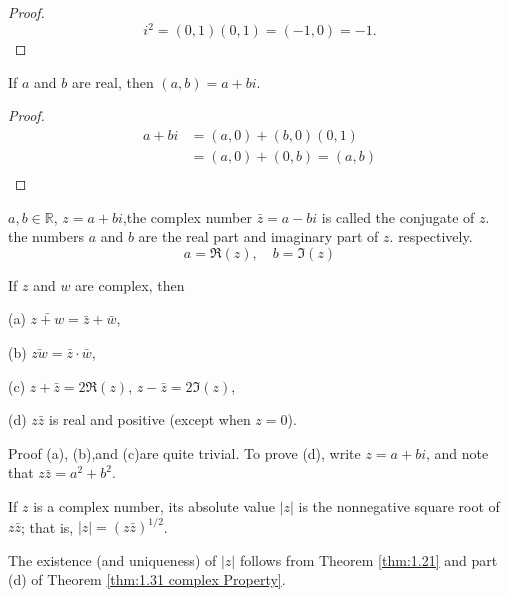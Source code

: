 \begin{proof}
    \begin{equation*}
        i^2=(0,1)(0,1)=(-1,0)=-1.
    \end{equation*}
\end{proof}

\begin{thm}\label{thm:1.29 complex number Transfer}
    If $a$ and $b$ are real, then $(a,b) =a + bi$.
\end{thm}

\begin{proof}
    \begin{align*}
        a+bi
        &=(a,0)+(b,0)(0,1)\\
        &=(a,0)+(0,b)=(a,b)\\
    \end{align*}
\end{proof}

\begin{myDef}\label{myDef:1.30 conjugate}
    $a,b\in \mathbb{R}$, $z=a+bi$,the complex number $\bar{z}=a-bi$ is called the conjugate of $z$. the numbers $a$ and $b$ are the real part and imaginary part of $z$. respectively.
    \begin{equation*}
        a=\Re(z), \quad
        b=\Im(z)
    \end{equation*}
\end{myDef}

\begin{thm}\label{thm:1.31 complex Property}
    If $z$ and $w$ are complex, then

    (a) $\bar{z+w}=\bar{z}+\bar{w}$,

    (b) $\bar{zw}=\bar{z}\cdot\bar{w}$,

    (c) $z+\bar{z}=2\Re(z)$, $z-\bar{z}=2\Im(z)$,

    (d) $z\bar{z}$ is real and positive (except when $z=0$).
\end{thm}
Proof (a), (b),and (c)are quite trivial. To prove (d), write $z = a + bi$,
and note that $z\bar{z} = a^2 + b^2$.

\begin{myDef}\label{myDef:1.32 complex_absolutevalue}
    If $z$ is a complex number, its absolute value $|z|$ is the nonnegative square root of $z\bar{z}$; that is, $|z| = (z\bar{z})^{1/2}$.
\end{myDef}
The existence (and uniqueness) of $|z|$ follows from Theorem \ref{thm:1.21} and
part (d) of Theorem \ref{thm:1.31 complex Property}.

